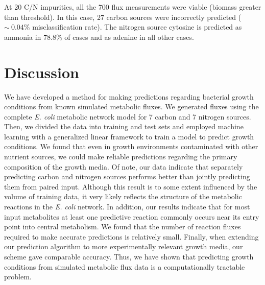\documentclass[12pt]{article}
\begin{document}
At 20 C/N impurities, all the 700 flux measurements were viable (biomass greater than threshold). In this case, 27 carbon sources were incorrectly predicted ($\sim~0.04\%$ misclassification rate). The nitrogen source cytosine is predicted as ammonia in 78.8\% of cases and as adenine in all other cases.

\section*{Discussion}

We have developed a method for making predictions regarding bacterial growth conditions from known simulated metabolic fluxes. We generated fluxes using the complete \emph{E. coli} metabolic network model for 7 carbon and 7 nitrogen sources. Then, we divided the data into training and test sets and employed machine learning with a generalized linear framework to train a model to predict growth conditions. We found that even in growth environments contaminated with other nutrient sources, we could make reliable predictions regarding the primary composition of the growth media. Of note, our data indicate that separately predicting carbon and nitrogen sources performs better than jointly predicting them from paired input. Although this result is to some extent influenced by the volume of training data, it very likely reflects the structure of the metabolic reactions in the \emph{E. coli} network. In addition, our results indicate that for most input metabolites at least one predictive reaction commonly occurs near its entry point into central metabolism. We found that the number of reaction fluxes required to make accurate predictions is relatively small. Finally, when extending our prediction algorithm to more experimentally relevant growth media, our scheme gave comparable accuracy. Thus, we have shown that predicting growth conditions from simulated metabolic flux data is a computationally tractable problem.
\end{document}
